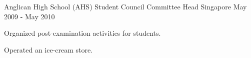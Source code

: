 

\begin{cventries}

  \cventry
    {Anglican High School (AHS)} %
    {Student Council Committee Head} %
    {Singapore} %
    {May 2009 - May 2010} %
    {
      \begin{cvitems} %
        \item {Organized post-examination activities for students.}
        \item {Operated an ice-cream store.}
      \end{cvitems}
    }

\end{cventries}
